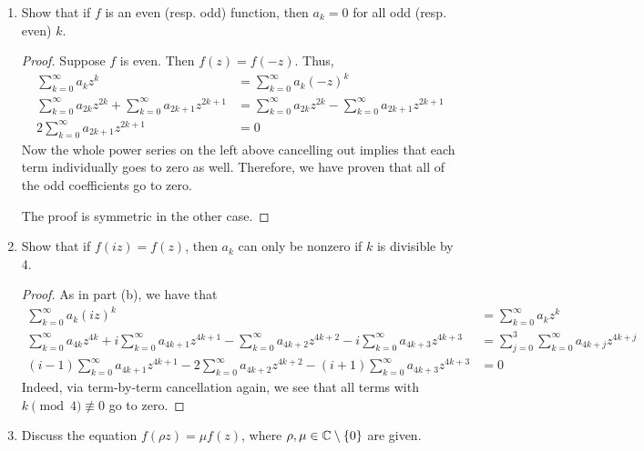 \documentclass[../psets.tex]{subfiles}
\begin{document}
\begin{enumerate}[ref={A.\arabic*}]
\begin{enumerate}
\begin{proof}
            \begin{equation*}
                f^{(k)}(0) = k!a_k
            \end{equation*}
            But since $a_k$ is complex, this means that the $k^\text{th}$ derivative of $f$ is complex, a contradiction for a real-valued function.
        \end{proof}
        \item Show that if $f$ is an even (resp. odd) function, then $a_k=0$ for all odd (resp. even) $k$.
        \begin{proof}
            Suppose $f$ is even. Then $f(z)=f(-z)$. Thus,
            \begin{align*}
                \sum_{k=0}^\infty a_kz^k &= \sum_{k=0}^\infty a_k(-z)^k\\
                \sum_{k=0}^\infty a_{2k}z^{2k}+\sum_{k=0}^\infty a_{2k+1}z^{2k+1} &= \sum_{k=0}^\infty a_{2k}z^{2k}-\sum_{k=0}^\infty a_{2k+1}z^{2k+1}\\
                2\sum_{k=0}^\infty a_{2k+1}z^{2k+1} &= 0
            \end{align*}
            Now the whole power series on the left above cancelling out implies that each term individually goes to zero as well. Therefore, we have proven that all of the odd coefficients go to zero.\par
            The proof is symmetric in the other case.
        \end{proof}
        \item Show that if $f(iz)=f(z)$, then $a_k$ can only be nonzero if $k$ is divisible by 4.
        \begin{proof}
            As in part (b), we have that
            \begin{align*}
                \sum_{k=0}^\infty a_k(iz)^k &= \sum_{k=0}^\infty a_kz^k\\
                \sum_{k=0}^\infty a_{4k}z^{4k}+i\sum_{k=0}^\infty a_{4k+1}z^{4k+1}-\sum_{k=0}^\infty a_{4k+2}z^{4k+2}-i\sum_{k=0}^\infty a_{4k+3}z^{4k+3} &= \sum_{j=0}^3\sum_{k=0}^\infty a_{4k+j}z^{4k+j}\\
                (i-1)\sum_{k=0}^\infty a_{4k+1}z^{4k+1}-2\sum_{k=0}^\infty a_{4k+2}z^{4k+2}-(i+1)\sum_{k=0}^\infty a_{4k+3}z^{4k+3} &= 0
            \end{align*}
            Indeed, via term-by-term cancellation again, we see that all terms with $k\pmod 4\not\equiv 0$ go to zero.
        \end{proof}
        \item Discuss the equation $f(\rho z)=\mu f(z)$, where $\rho,\mu\in\mathbb{C}\setminus\{0\}$ are given.

\end{enumerate}
\end{enumerate}
\end{document}
